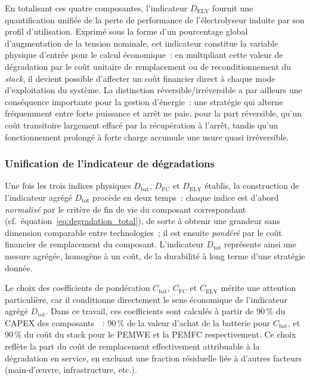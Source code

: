 En totalisant ces quatre composantes, l'indicateur $D_{\text{ELY}}$ fournit une quantification unifiée de la perte de performance de l'électrolyseur induite par son profil d'utilisation. Exprimé sous la forme d'un pourcentage global d'augmentation de la tension nominale, cet indicateur constitue la variable physique d'entrée pour le calcul économique~: en multipliant cette valeur de dégradation par le coût unitaire de remplacement ou de reconditionnement du \textit{stack}, il devient possible d'affecter un coût financier direct à chaque mode d'exploitation du système. La distinction réversible/irréversible a par ailleurs une conséquence importante pour la gestion d'énergie~: une stratégie qui alterne fréquemment entre forte puissance et arrêt ne paie, pour la part réversible, qu'un coût transitoire largement effacé par la récupération à l'arrêt, tandis qu'un fonctionnement prolongé à forte charge accumule une usure quasi irréversible.

\subsubsection{Unification de l'indicateur de dégradations}

Une fois les trois indices physiques $D_{\text{bat}}$, $D_{\text{FC}}$ et $D_{\text{ELY}}$ établis, la construction de l'indicateur agrégé $D_{\text{tot}}$ procède en deux temps~: chaque indice est d'abord \emph{normalisé} par le critère de fin de vie du composant correspondant (cf.\ équation~\ref{eq:degradation_total}), de sorte à obtenir une grandeur sans dimension comparable entre technologies~; il est ensuite \emph{pondéré} par le coût financier de remplacement du composant. L'indicateur $D_{\text{tot}}$ représente ainsi une mesure agrégée, homogène à un coût, de la durabilité à long terme d'une stratégie donnée.

Le choix des coefficients de pondération $C_{\text{bat}}$, $C_{\text{FC}}$ et $C_{\text{ELY}}$ mérite une attention particulière, car il conditionne directement le sens économique de l'indicateur agrégé $D_{\text{tot}}$. Dans ce travail, ces coefficients sont calculés à partir de 90\,\% du CAPEX des composants~\cite{noauthor_kpis_nodate}\cite{noauthor_electrolyser_nodate}\cite{noauthor_clean_nodate}~: 90\,\% de la valeur d'achat de la batterie pour $C_{\text{bat}}$, et 90\,\% du coût du stack pour le PEMWE et la PEMFC respectivement. Ce choix reflète la part du coût de remplacement effectivement attribuable à la dégradation en service, en excluant une fraction résiduelle liée à d'autres facteurs (main-d'œuvre, infrastructure, etc.).

